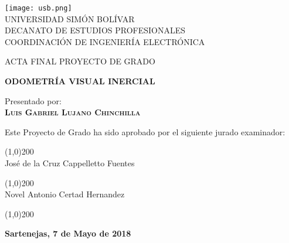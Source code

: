 \begin{titlepage}
\begin{center}

\texttt{[image: usb.png]} \\

\textsc {\large UNIVERSIDAD SIMÓN BOLÍVAR} \\
\textsc{DECANATO DE ESTUDIOS PROFESIONALES\\
COORDINACIÓN DE INGENIERÍA ELECTRÓNICA}

\bigskip
\bigskip
\bigskip
\bigskip

\textsc{ACTA FINAL PROYECTO DE GRADO}

\bigskip
\bigskip

\textsc{\bfseries ODOMETRÍA VISUAL INERCIAL}

\bigskip
\bigskip
\bigskip

\begin{minipage}{\textwidth}
\centering
Presentado por: \\
\textsc{\bfseries Luis Gabriel Lujano Chinchilla} \\

\bigskip
\bigskip

Este Proyecto de Grado ha sido aprobado por el siguiente jurado examinador: \\

\bigskip
\bigskip

\line(1,0){200} \\
José de la Cruz Cappelletto Fuentes\\

\bigskip
\bigskip

\line(1,0){200} \\
Novel Antonio Certad Hernandez\\


\bigskip
\bigskip

\line(1,0){200} \\

\bigskip
\bigskip

\end{minipage}

\bigskip
\bigskip
\vfill

{\large \bfseries Sartenejas, 7 de Mayo de 2018}

\end{center}
\end{titlepage}
